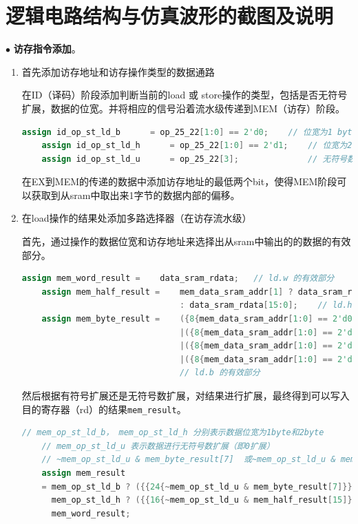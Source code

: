 \documentclass[11pt]{article}
\begin{document}


\section{逻辑电路结构与仿真波形的截图及说明}

\noindent
$\bullet$
\textbf{访存指令添加}。
\begin{enumerate}
  \item 首先添加访存地址和访存操作类型的数据通路
  
  在ID（译码）阶段添加判断当前的load 或 store操作的类型，包括是否无符号扩展，数据的位宽。并将相应的信号沿着流水级传递到MEM（访存）阶段。

  \begin{lstlisting}[language=verilog]
    assign id_op_st_ld_b      = op_25_22[1:0] == 2'd0;    // 位宽为1 byte
    assign id_op_st_ld_h      = op_25_22[1:0] == 2'd1;    // 位宽为2 byte
    assign id_op_st_ld_u      = op_25_22[3];              // 无符号数扩展
  \end{lstlisting}

  在EX到MEM的传递的数据中添加访存地址的最低两个bit，使得MEM阶段可以获取到从sram中取出来1字节的数据内部的偏移。
  \item 在load操作的结果处添加多路选择器（在访存流水级）
  
  首先，通过操作的数据位宽和访存地址来选择出从sram中输出的的数据的有效部分。
  \begin{lstlisting}[language=verilog]
    assign mem_word_result =    data_sram_rdata;   // ld.w 的有效部分
    assign mem_half_result =    mem_data_sram_addr[1] ? data_sram_rdata[31:16]
                                : data_sram_rdata[15:0];    // ld.h 的有效部分
    assign mem_byte_result =    ({8{mem_data_sram_addr[1:0] == 2'd0}} & data_sram_rdata[7:0])
                                |({8{mem_data_sram_addr[1:0] == 2'd1}} & data_sram_rdata[15:8])
                                |({8{mem_data_sram_addr[1:0] == 2'd2}} & data_sram_rdata[23:16])
                                |({8{mem_data_sram_addr[1:0] == 2'd3}} & data_sram_rdata[31:24]);
                                // ld.b 的有效部分

  \end{lstlisting}

  然后根据有符号扩展还是无符号数扩展，对结果进行扩展，最终得到可以写入目的寄存器（rd）的结果\verb|mem_result|。
  \begin{lstlisting}[language=verilog]
    // mem_op_st_ld_b， mem_op_st_ld_h 分别表示数据位宽为1byte和2byte
    // mem_op_st_ld_u 表示数据进行无符号数扩展（即0扩展）
    // ~mem_op_st_ld_u & mem_byte_result[7]  或~mem_op_st_ld_u & mem_half_result[15] 表示符号位
    assign mem_result 
    = mem_op_st_ld_b ? ({{24{~mem_op_st_ld_u & mem_byte_result[7]}}, mem_byte_result[7:0]}):       
      mem_op_st_ld_h ? ({{16{~mem_op_st_ld_u & mem_half_result[15]}}, mem_half_result[15:0]}) :
      mem_word_result;
  \end{lstlisting}


\end{enumerate}
\end{document}
